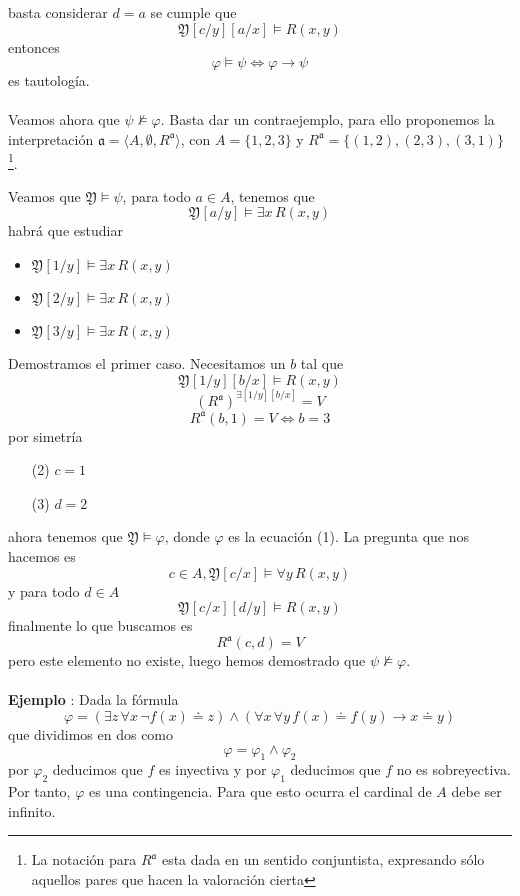 basta considerar $d=a$ se cumple que   
\[ \mathfrak{Y}[c/y][a/x] \models R(x, y) \]
entonces 
\[ \varphi \models \psi \Leftrightarrow \varphi \rightarrow \psi  \]
es tautología.
\paragraph{}
Veamos ahora que $\psi \not \models \varphi$. Basta dar un contraejemplo, para ello proponemos la interpretación  $\mathfrak{a} = \langle A, \emptyset, R^{\mathfrak{a}} \rangle$, con $A =  \{1, 2, 3 \}$ y $R^{\mathfrak{a}} = \{(1, 2), (2, 3), (3, 1)\}$\footnote{La notación para $R^{\mathfrak{a}}$ esta dada en un sentido conjuntista, expresando sólo aquellos pares que hacen la valoración cierta}.

Veamos que $\mathfrak{Y} \models \psi$, para todo $a \in A$, tenemos que 
\[ \mathfrak{Y}[a/y] \models \exists x \, R(x,y) \]
habrá que estudiar 
\begin{itemize}
	\item $\mathfrak{Y}[1/y] \models \exists x \, R(x,y)$
	\item $\mathfrak{Y}[2/y] \models \exists x \, R(x,y)$
	\item $\mathfrak{Y}[3/y] \models \exists x \, R(x,y)$
\end{itemize}
Demostramos el primer caso. Necesitamos un $b$ tal que 
\[ \mathfrak{Y}[1/y][b/x] \models R(x,y) \]
\[ (R^{\mathfrak{a}})^{\exists [1/y][b/x]}=V \]
\[ R^{\mathfrak{a}}(b,1)=V \Leftrightarrow b=3 \]
por simetría  
\begin{itemize}
	\item[(2)] $c=1$
	\item[(3)] $d=2$
\end{itemize}
ahora tenemos que $\mathfrak{Y} \models \varphi$, donde $\varphi$ es la ecuación (1). La pregunta que nos hacemos es 
\[ c \in A, \mathfrak{Y}[c/x] \models \forall y \, R(x, y) \]
y para todo $d \in A$
\[ \mathfrak{Y}[c/x][d/y] \models R(x, y) \]
finalmente lo que buscamos es 
\[ R^{\mathfrak{a}}(c,d)=V \]
pero este elemento no existe, luego hemos demostrado que $\psi \not \models \varphi$.
\paragraph{}
\addtocounter{ej}{1} %
\textbf{Ejemplo }: Dada la fórmula
\begin{equation}
\varphi = (\exists z \, \forall x \, \neg f(x) \doteq z) \land (\forall x \, \forall y \, f(x) \doteq f(y) \rightarrow x \doteq y) 
\end{equation}
que dividimos en dos como 
\[ \varphi = \varphi_1 \wedge \varphi_2 \]
por $\varphi_2$ deducimos que $f$ es inyectiva y por $\varphi_1$ deducimos que $f$ no es sobreyectiva. Por tanto, $\varphi$ es una contingencia. Para que esto ocurra el cardinal de $A$ debe ser infinito. 
